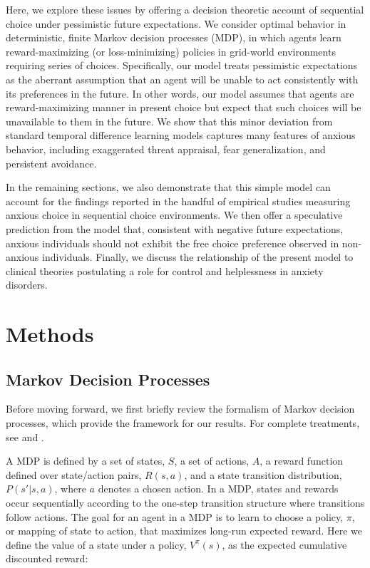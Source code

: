 \documentclass[11pt]{article} %
\begin{document}
Here, we explore these issues by offering a decision theoretic account of sequential choice under pessimistic future expectations. We consider optimal behavior in deterministic, finite Markov decision processes (MDP), in which agents learn reward-maximizing (or loss-minimizing) policies in grid-world environments requiring series of choices. Specifically, our model treats pessimistic expectations as the aberrant assumption that an agent will be unable to act consistently with its preferences in the future. In other words, our model assumes that agents are reward-maximizing manner in present choice but expect that such choices will be unavailable to them in the future. We show that this minor deviation from standard temporal difference learning models captures many features of anxious behavior, including exaggerated threat appraisal, fear generalization, and persistent avoidance.

In the remaining sections, we also demonstrate that this simple model can account for the findings reported in the handful of empirical studies measuring anxious choice in sequential choice environments. We then offer a speculative prediction from the model that, consistent with negative future expectations, anxious individuals should not exhibit the free choice preference observed in non-anxious individuals. Finally, we discuss the relationship of the present model to clinical theories postulating a role for control and helplessness in anxiety disorders. 

\section{Methods}

\subsection{Markov Decision Processes}

Before moving forward, we first briefly review the formalism of Markov decision processes, which provide the framework for our results. For complete treatments, see \cite{SuttonBarto1998, SuttonBarto2018} and \cite{bertsekas2005}.

A MDP is defined by a set of states, $S$, a set of actions, $A$, a reward function defined over state/action pairs, $R(s,a)$, and a state transition distribution, $P(s'|s,a)$, where $a$ denotes a chosen action. In a MDP, states and rewards occur sequentially according to the one-step transition structure where transitions follow actions. The goal for an agent in a MDP is to learn to choose a policy, $\pi$, or mapping of state to action, that maximizes long-run expected reward. Here we define the value of a state under a policy, $V^\pi(s)$, as the expected cumulative discounted reward:
\end{document}
